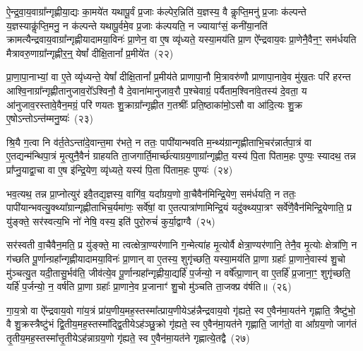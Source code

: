 {\anuvakamend[{तस्मा᳚द्गाय॒त्र्येका॒न्नप॑ञ्चा॒शच्च॑}]}%

ऐ॒न्द्र॒वा॒य॒वाग्रा᳚न्गृह्णीया॒द्यः का॒मये॑त यथापू॒र्वं प्र॒जाः क॑ल्पेर॒न्निति॑ य॒ज्ञस्य॒ वै कॢप्ति॒मनु॑ प्र॒जाः क॑ल्पन्ते य॒ज्ञस्याकॢ॑प्ति॒मनु॒ न क॑ल्पन्ते यथापू॒र्वमे॒व प्र॒जाः क॑ल्पयति॒ न ज्यायाꣳ॑सं॒ कनी॑या॒नति॑ क्रामत्यैन्द्रवाय॒वाग्रा᳚न्गृह्णीयादामया॒विनः॑ प्रा॒णेन॒ वा ए॒ष व्यृ॑ध्यते॒ यस्या॒मय॑ति प्रा॒ण ऐ᳚न्द्रवाय॒वः प्रा॒णेनै॒वैन॒ꣳ॒ सम॑र्धयति मैत्रावरु॒णाग्रा᳚न्गृह्णीर॒न्॒ येषां᳚ दीक्षि॒तानां᳚ प्र॒मीये॑त~(२२)

प्रा॒णा॒पा॒नाभ्यां॒ वा ए॒ते व्यृ॑ध्यन्ते॒ येषां᳚ दीक्षि॒तानां᳚ प्र॒मीय॑ते प्राणापा॒नौ मि॒त्रावरु॑णौ प्राणापा॒नावे॒व मु॑ख॒तः परि॑ हरन्त आश्वि॒नाग्रा᳚न्गृह्णीतानुजाव॒रो᳚\-ऽश्विनौ॒ वै दे॒वाना॑मानुजाव॒रौ प॒श्चेवाग्रं॒ पर्यैताम॒श्विना॑वे॒तस्य॑ दे॒वता॒ य आ॑नुजाव॒रस्तावे॒वैन॒मग्रं॒ परि॑ णयतः शु॒क्राग्रा᳚न्गृह्णीत ग॒तश्रीः᳚ प्रति॒ष्ठाका॑मो॒\-ऽसौ वा आ॑दि॒त्यः शु॒क्र ए॒षो\-ऽन्तो\-ऽन्त॑म्मनु॒ष्यः॑~(२३)

श्रि॒यै ग॒त्वा नि व॑र्त॒ते\-ऽन्ता॑दे॒वान्त॒मा र॑भते॒ न ततः॒ पापी॑यान्भवति म॒न्थ्य॑ग्रान्गृह्णीताभि॒चर॑न्नार्तपा॒त्रं वा ए॒तद्यन्म॑न्थिपा॒त्रं मृ॒त्युनै॒वैनं॑ ग्राहयति ता॒जगार्ति॒मार्च्छ॑त्याग्रय॒णाग्रा᳚न्गृह्णीत॒ यस्य॑ पि॒ता पि॑ताम॒हः पुण्यः॒ स्यादथ॒ तन्न प्रा᳚प्नु॒याद्वा॒चा वा ए॒ष इ॑न्द्रि॒येण॒ व्यृ॑ध्यते॒ यस्य॑ पि॒ता पि॑ताम॒हः पुण्यः॑~(२४)

भव॒त्यथ॒ तन्न प्रा॒प्नोत्युर॑ इवै॒तद्य॒ज्ञस्य॒ वागि॑व॒ यदा᳚ग्रय॒णो वा॒चैवैन॑मिन्द्रि॒येण॒ सम॑र्धयति॒ न ततः॒ पापी॑यान्भव\-त्यु॒क्थ्या᳚ग्रान्गृह्णीताभिच॒र्यमा॑णः॒ सर्वे॑षां॒ वा ए॒तत्पात्रा॑णामिन्द्रि॒यं यदु॑क्थ्यपा॒त्रꣳ सर्वे॑णै॒वैन॑मिन्द्रि॒येणाति॒ प्र यु॑ङ्क्ते॒ सर॑स्वत्य॒भि नो॑ नेषि॒ वस्य॒ इति॑ पुरो॒रुचं॑ कुर्या॒द्वाग्वै~(२५)

सर॑स्वती वा॒चैवैन॒मति॒ प्र यु॑ङ्क्ते॒ मा त्वत्क्षेत्रा॒ण्यर॑णानि ग॒न्मेत्या॑ह मृ॒त्योर्वै क्षेत्रा॒ण्यर॑णानि॒ तेनै॒व मृ॒त्योः क्षेत्रा॑णि॒ न ग॑च्छति पू॒र्णान्ग्रहा᳚न्गृह्णीयादामया॒विनः॑ प्रा॒णान् वा ए॒तस्य॒ शुगृ॑च्छति॒ यस्या॒मय॑ति प्रा॒णा ग्रहाः᳚ प्रा॒णाने॒वास्य॑ शु॒चो मु॑ञ्चत्यु॒त यदी॒तासु॒र्भव॑ति॒ जीव॑त्ये॒व पू॒र्णान्ग्रहा᳚न्गृह्णीया॒द्यर्\mbox{}हि॑ प॒र्जन्यो॒ न वर्\mbox{}षे᳚त्प्रा॒णान् वा ए॒तर्\mbox{}हि॑ प्र॒जाना॒ꣳ॒ शुगृ॑च्छति॒ यर्\mbox{}हि॑ प॒र्जन्यो॒ न॒ वर्\mbox{}ष॑ति प्रा॒णा ग्रहाः᳚ प्रा॒णाने॒व प्र॒जानाꣳ॑ शु॒चो मु॑ञ्चति ता॒जक्प्र व॑र्\mbox{}षति॥~(२६)

{\anuvakamend[{प्र॒मीये॑त मनु॒ष्य॑ ऋध्यते॒ यस्य॑ पि॒ता पि॑ताम॒हः पुण्यो॒ वाग्वा ए॒व पू॒र्णान्ग्रहा॒न्पञ्च॑विꣳशतिश्च}]}%

गा॒य॒त्रो वा ऐ᳚न्द्रवाय॒वो गा॑य॒त्रं प्रा॑य॒णीय॒मह॒स्तस्मा᳚त्प्राय॒णीये\-ऽह॑न्नैन्द्रवाय॒वो गृ॑ह्यते॒ स्व ए॒वैन॑मा॒यत॑ने गृह्णाति॒ त्रैष्टु॑भो॒ वै शु॒क्रस्त्रैष्टु॑भं द्वि॒तीय॒मह॒स्तस्मा᳚द्द्वि॒तीये\-ऽह॑ञ्छु॒क्रो गृ॑ह्यते॒ स्व ए॒वैन॑मा॒यत॑ने गृह्णाति॒ जाग॑तो॒ वा आ᳚ग्रय॒णो जाग॑तं तृ॒तीय॒मह॒स्तस्मा᳚त्तृ॒तीये\-ऽह॑न्नाग्रय॒णो गृ॑ह्यते॒ स्व ए॒वैन॑मा॒यत॑ने गृह्णात्ये॒तद्वै~(२७)

